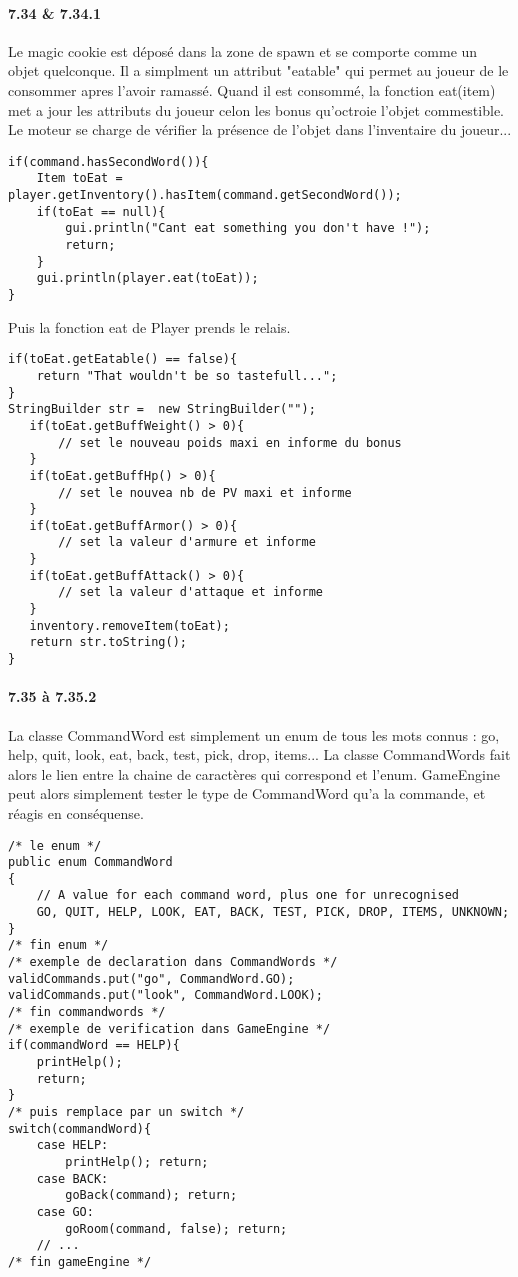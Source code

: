 \documentclass[11pt,a4paper]{report}
\begin{document}
\paragraph{7.34 \& 7.34.1}
Le magic cookie est déposé dans la zone de spawn et se comporte comme un objet quelconque. Il a simplment un attribut "eatable" qui permet au joueur de le consommer apres l'avoir ramassé. Quand il est consommé, la fonction eat(item) met a jour les attributs du joueur celon les bonus qu'octroie l'objet commestible. Le moteur se charge de vérifier la présence de l'objet dans l'inventaire du joueur...
\begin{lstlisting}
if(command.hasSecondWord()){
    Item toEat = player.getInventory().hasItem(command.getSecondWord());
    if(toEat == null){
        gui.println("Cant eat something you don't have !");
        return;
    }
    gui.println(player.eat(toEat));
}
\end{lstlisting}
Puis la fonction eat de Player prends le relais.
\begin{lstlisting}
if(toEat.getEatable() == false){
    return "That wouldn't be so tastefull...";
}
StringBuilder str =  new StringBuilder("");
   if(toEat.getBuffWeight() > 0){
       // set le nouveau poids maxi en informe du bonus
   }
   if(toEat.getBuffHp() > 0){
       // set le nouvea nb de PV maxi et informe
   }
   if(toEat.getBuffArmor() > 0){
       // set la valeur d'armure et informe
   }
   if(toEat.getBuffAttack() > 0){
       // set la valeur d'attaque et informe
   }
   inventory.removeItem(toEat);   
   return str.toString();
}
\end{lstlisting}

\paragraph{7.35 à 7.35.2}
La classe CommandWord est simplement un enum de tous les mots connus : go, help, quit, look, eat, back, test, pick, drop, items... La classe CommandWords fait alors le lien entre la chaine de caractères qui correspond et l'enum. GameEngine peut alors simplement tester le type de CommandWord qu'a la commande, et réagis en conséquense.
\begin{lstlisting}
/* le enum */
public enum CommandWord
{
    // A value for each command word, plus one for unrecognised
    GO, QUIT, HELP, LOOK, EAT, BACK, TEST, PICK, DROP, ITEMS, UNKNOWN;
}
/* fin enum */
/* exemple de declaration dans CommandWords */
validCommands.put("go", CommandWord.GO);
validCommands.put("look", CommandWord.LOOK);
/* fin commandwords */
/* exemple de verification dans GameEngine */
if(commandWord == HELP){
    printHelp();
    return;
}
/* puis remplace par un switch */
switch(commandWord){
    case HELP:
        printHelp(); return;
    case BACK:
        goBack(command); return;
    case GO:
        goRoom(command, false); return;
    // ...
/* fin gameEngine */

\end{lstlisting}
\end{document}
